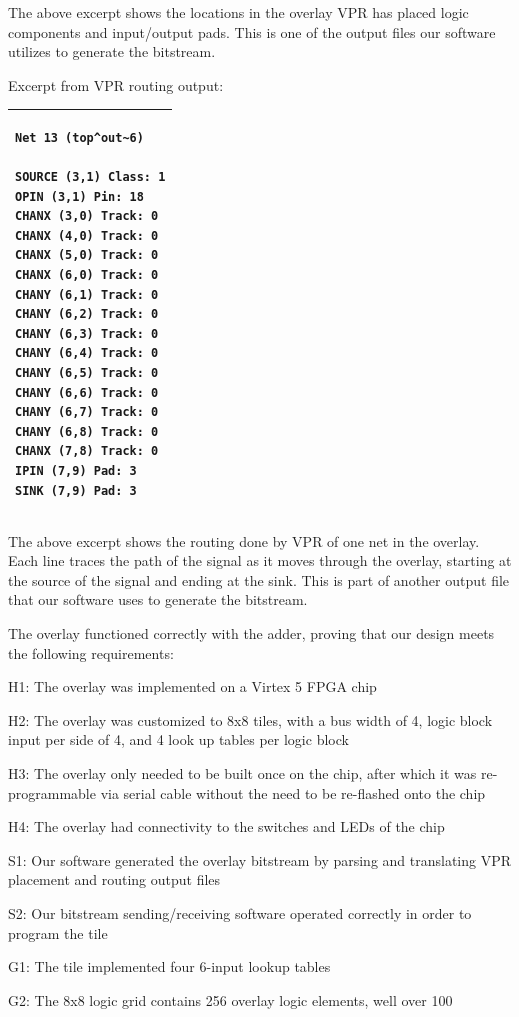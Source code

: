The above excerpt shows the locations in the overlay VPR has placed logic components and input/output pads.
This is one of the output files our software utilizes to generate the bitstream.

Excerpt from VPR routing output:

\begin{tabular}{|p{5cm}|}
\hline
\begin{verbatim}
Net 13 (top^out~6)

SOURCE (3,1) Class: 1
OPIN (3,1) Pin: 18
CHANX (3,0) Track: 0
CHANX (4,0) Track: 0
CHANX (5,0) Track: 0
CHANX (6,0) Track: 0
CHANY (6,1) Track: 0
CHANY (6,2) Track: 0
CHANY (6,3) Track: 0
CHANY (6,4) Track: 0
CHANY (6,5) Track: 0
CHANY (6,6) Track: 0
CHANY (6,7) Track: 0
CHANY (6,8) Track: 0
CHANX (7,8) Track: 0
IPIN (7,9) Pad: 3
SINK (7,9) Pad: 3
\end{verbatim}
\\ \hline
\end{tabular}

The above excerpt shows the routing done by VPR of one net in the overlay.
Each line traces the path of the signal as it moves through the overlay, starting at the source of the signal and ending at the sink.
This is part of another output file that our software uses to generate the bitstream.

The overlay functioned correctly with the adder, proving that our design meets the following requirements:
\begin{itemlist}
	\item H1: The overlay was implemented on a Virtex 5 FPGA chip
	\item H2: The overlay was customized to 8x8 tiles, with a bus width of 4, logic block input per side of 4, and 4 look up tables per logic block
	\item H3: The overlay only needed to be built once on the chip, after which it was re-programmable via serial cable without the need to be re-flashed onto the chip
	\item H4: The overlay had connectivity to the switches and LEDs of the chip
	\item S1: Our software generated the overlay bitstream by parsing and translating VPR placement and routing output files
	\item S2: Our bitstream sending/receiving software operated correctly in order to program the tile
	\item G1: The tile implemented four 6-input lookup tables
	\item G2: The 8x8 logic grid contains 256 overlay logic elements, well over 100
\end{itemlist}




